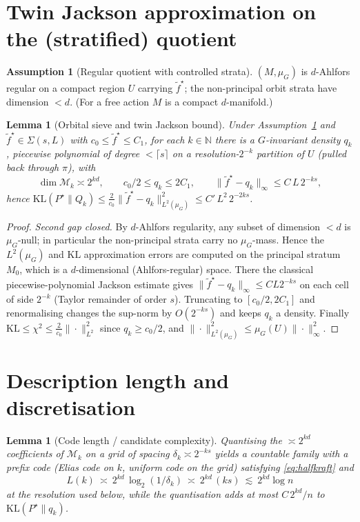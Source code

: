 \documentclass[11pt]{article}
\theoremstyle{plain}
\newtheorem{lemma}[theorem]{Lemma}
\theoremstyle{definition}
\newtheorem{assumption}{Assumption}
\theoremstyle{remark}
\newcommand{\N}{\mathbb{N}}
\newcommand{\KL}{\mathrm{KL}}
\DeclareMathOperator{\dimm}{dim}
\begin{document}
\section{Twin Jackson approximation on the (stratified) quotient}

\begin{assumption}[Regular quotient with controlled strata]\label{ass:strata}
$(M,\mu_G)$ is $d$-Ahlfors regular on a compact region $U$ carrying $\tilde
f^\star$; the non-principal orbit strata have dimension $<d$. (For a free action
$M$ is a compact $d$-manifold.)
\end{assumption}

\begin{lemma}[Orbital sieve and twin Jackson bound]\label{lem:jackson}
Under Assumption~\ref{ass:strata} and $\tilde f^\star\in\Sigma(s,L)$ with $c_0\le
\tilde f^\star\le C_1$, for each $k\in\N$ there is a $G$-invariant density $q_k$,
piecewise polynomial of degree $<\lceil s\rceil$ on a resolution-$2^{-k}$
partition of $U$ (pulled back through $\pi$), with
\[
\dimm\mathcal M_k\asymp 2^{kd},\qquad
c_0/2\le q_k\le 2C_1,\qquad
\|\tilde f^\star-q_k\|_\infty\le C\,L\,2^{-ks},
\]
hence $\KL(P^\star\|Q_k)\le \tfrac{2}{c_0}\|\tilde f^\star-q_k\|_{L^2(\mu_G)}^2
\le C'\,L^2\,2^{-2ks}$.
\end{lemma}

\begin{proof}
\emph{Second gap closed.} By $d$-Ahlfors regularity, any subset of dimension
$<d$ is $\mu_G$-null; in particular the non-principal strata carry no $\mu_G$-mass.
Hence the $L^2(\mu_G)$ and $\KL$ approximation errors are computed on the principal
stratum $M_0$, which is a $d$-dimensional (Ahlfors-regular) space. There the
classical piecewise-polynomial Jackson estimate gives
$\|\tilde f^\star-q_k\|_\infty\le CL2^{-ks}$ on each cell of side $2^{-k}$ (Taylor
remainder of order $s$). Truncating to $[c_0/2,2C_1]$ and renormalising changes
the sup-norm by $O(2^{-ks})$ and keeps $q_k$ a density. Finally
$\KL\le\chi^2\le\frac{2}{c_0}\|\cdot\|_{L^2}^2$ since $q_k\ge c_0/2$, and
$\|\cdot\|_{L^2(\mu_G)}^2\le\mu_G(U)\|\cdot\|_\infty^2$.
\end{proof}

\section{Description length and discretisation}

\begin{lemma}[Code length / candidate complexity]\label{lem:code}
Quantising the $\asymp2^{kd}$ coefficients of $\mathcal M_k$ on a grid of spacing
$\delta_k\asymp 2^{-ks}$ yields a countable family with a prefix code (Elias code
on $k$, uniform code on the grid) satisfying \eqref{eq:halfkraft} and
\[
L(k)\ \asymp\ 2^{kd}\,\log_2(1/\delta_k)\ \asymp\ 2^{kd}\,(ks)\ \lesssim\ 2^{kd}\log n
\]
at the resolution used below, while the quantisation adds at most $C\,2^{kd}/n$ to
$\KL(P^\star\|q_k)$.
\end{lemma}
\end{document}
